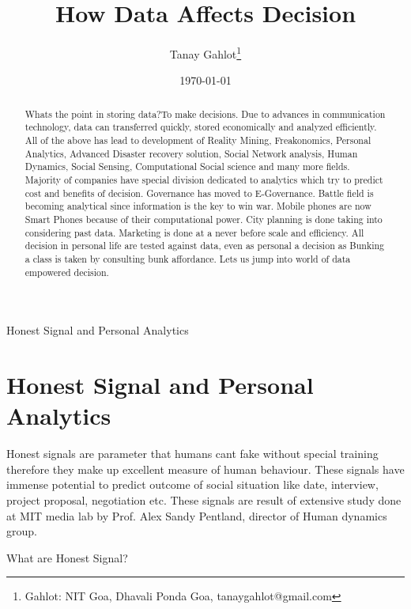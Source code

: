 \documentclass[AER]{AEA}
\begin{document}
\title{How Data Affects Decision}
\author{Tanay Gahlot\thanks{Gahlot: NIT Goa, Dhavali Ponda Goa, tanaygahlot@gmail.com}}
\date{\today}
\JEL{}
\Keywords{}

\begin{abstract}
Whats the point in storing data?To make decisions. Due to advances in communication technology, data can transferred quickly, stored economically and analyzed efficiently. All of the above has lead to development of Reality Mining, Freakonomics, Personal Analytics, Advanced Disaster recovery solution, Social Network analysis, Human Dynamics, Social Sensing, Computational Social science and many more fields. Majority of companies have special division dedicated to analytics which try to predict cost and benefits of decision. Governance has moved to E-Governance. Battle field is becoming analytical since information is the key to win war. Mobile phones are now Smart Phones because of their computational power. City planning is done taking into considering past data. Marketing is done at a never before scale and efficiency. All decision in personal life are tested against data, even as personal a decision as Bunking a class is taken by consulting bunk affordance. Lets us jump into world of data empowered decision.
\end{abstract}


\maketitle

Honest Signal and Personal Analytics

\section{Honest Signal and Personal Analytics}
Honest signals are parameter that humans cant fake without special training therefore they make up excellent measure of human behaviour. These signals have immense potential to predict outcome of social situation like date, interview, project proposal, negotiation etc. These signals are result of extensive study done at MIT media lab by Prof. Alex Sandy Pentland, director of Human dynamics group.

What are Honest Signal?
\end{document}
